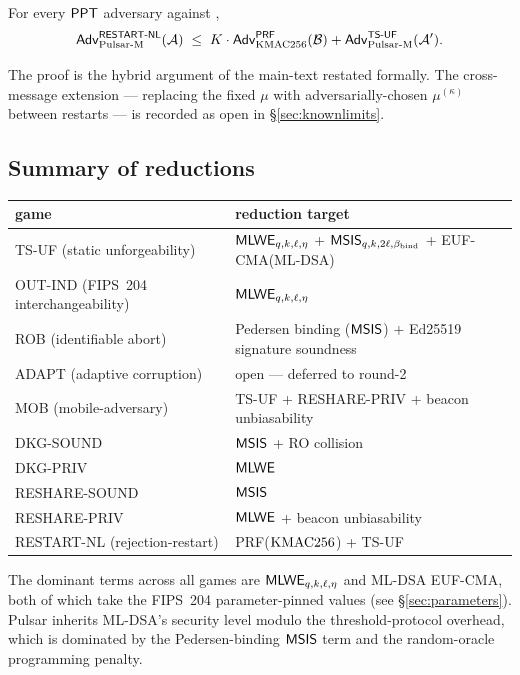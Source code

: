 \begin{theorem}
\label{thm:restart-nl-game}
For every $\mathsf{PPT}$ adversary against ,
\[
\mathsf{Adv}^{\mathsf{RESTART\textsf{-}NL}}_{\mathrm{Pulsar\text{-}M}}(\mathcal{A})
\;\le\;
K \cdot \mathsf{Adv}^{\mathsf{PRF}}_{\mathrm{KMAC256}}(\mathcal{B})
+ \mathsf{Adv}^{\mathsf{TS\textsf{-}UF}}_{\mathrm{Pulsar\text{-}M}}(\mathcal{A}').
\]
\end{theorem}

The proof is the hybrid argument of the main-text
 restated formally. The cross-message
extension --- replacing the fixed $\mu$ with adversarially-chosen
$\mu^{(\kappa)}$ between restarts --- is recorded as open in
\S\ref{sec:knownlimits}.

\subsection{Summary of reductions}
\label{sec:sec-summary}

\begin{center}
\begin{tabular}{l l}
\toprule
game & reduction target \\
\midrule
TS-UF (static unforgeability) & $\mathsf{MLWE}_{q,k,\ell,\eta}$ + $\mathsf{MSIS}_{q,k,2\ell,\beta_{\mathrm{bind}}}$ + EUF-CMA(ML-DSA) \\
OUT-IND (FIPS~204 interchangeability) & $\mathsf{MLWE}_{q,k,\ell,\eta}$ \\
ROB (identifiable abort) & Pedersen binding ($\mathsf{MSIS}$) + Ed25519 signature soundness \\
ADAPT (adaptive corruption) & open --- deferred to round-2 \\
MOB (mobile-adversary) & TS-UF + RESHARE-PRIV + beacon unbiasability \\
DKG-SOUND & $\mathsf{MSIS}$ + RO collision \\
DKG-PRIV & $\mathsf{MLWE}$ \\
RESHARE-SOUND & $\mathsf{MSIS}$ \\
RESHARE-PRIV & $\mathsf{MLWE}$ + beacon unbiasability \\
RESTART-NL (rejection-restart) & PRF($\mathrm{KMAC256}$) + TS-UF \\
\bottomrule
\end{tabular}
\end{center}

The dominant terms across all games are $\mathsf{MLWE}_{q, k, \ell, \eta}$
and ML-DSA EUF-CMA, both of which take the FIPS~204
parameter-pinned values (see \S\ref{sec:parameters}). Pulsar
inherits ML-DSA's security level modulo the threshold-protocol
overhead, which is dominated by the Pedersen-binding $\mathsf{MSIS}$ term
and the random-oracle programming penalty.

